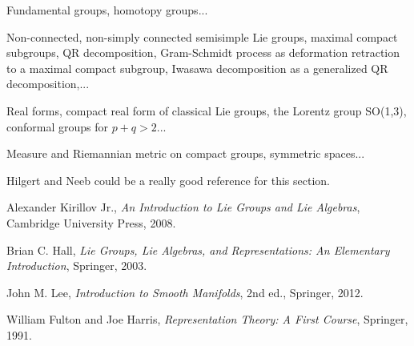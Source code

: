 \documentclass[aps,nofootinbib]{revtex4}
\begin{document}
Fundamental groups, homotopy groups...

Non-connected, non-simply connected semisimple Lie groups, maximal compact subgroups, QR decomposition, Gram-Schmidt process as deformation retraction to a maximal compact subgroup, Iwasawa decomposition as a generalized QR decomposition,...

Real forms, compact real form of classical Lie groups, the Lorentz group SO(1,3), conformal groups for $p+q>2$...

Measure and Riemannian metric on compact groups, symmetric spaces...

Hilgert and Neeb could be a really good reference for this section.

\begin{thebibliography}{99}

Alexander Kirillov Jr., \emph{An Introduction to Lie Groups and Lie Algebras}, Cambridge University Press, 2008.

Brian C. Hall, \emph{Lie Groups, Lie Algebras, and Representations: An Elementary Introduction}, Springer, 2003.



John M. Lee, \emph{Introduction to Smooth Manifolds}, 2nd ed., Springer, 2012.

William Fulton and Joe Harris, \emph{Representation Theory: A First Course}, Springer, 1991.






\end{thebibliography}
\end{document}
